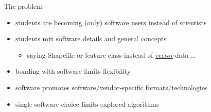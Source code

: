 \documentclass[xcolor={dvipsnames,usenames},beamer,aspectratio=169]{beamer}
\begin{document}
\begin{frame}{The problem}



\begin{itemize}
 \item students are becoming (only) software users instead of scientists
 \item students mix software details and general concepts
 \begin{itemize}
  \item saying Shapefile or feature class instead of
    \href{http://www.opengeospatial.org/ogc/glossary/v}{\emph{vector}} data%
    \ldots
\end{itemize}
 \item bonding with software limits flexibility
 \item software promotes software/vendor-specific formats/technologies
 \item single software choice limits explored algorithms

\end{itemize}

\end{frame}
\end{document}
